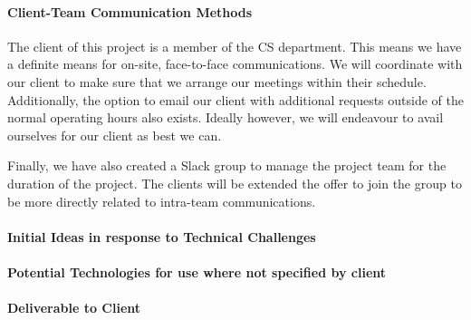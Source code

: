 \documentclass[12pt]{article}
\begin{document}
\paragraph{Client-Team Communication Methods}
The client of this project is a member of the CS department. This means we have a definite means for on-site, face-to-face communications. We will coordinate with our client to make sure that we arrange our meetings within their schedule. Additionally, the option to email our client with additional requests outside of the normal operating hours also exists. Ideally however, we will endeavour to avail ourselves for our client as best we can.

Finally, we have also created a Slack group to manage the project team for the duration of the project. The clients will be extended the offer to join the group to be more directly related to intra-team communications.
\paragraph{Initial Ideas in response to Technical Challenges}
\paragraph{Potential Technologies for use where not specified by client}
\paragraph{Deliverable to Client}
\end{document}
